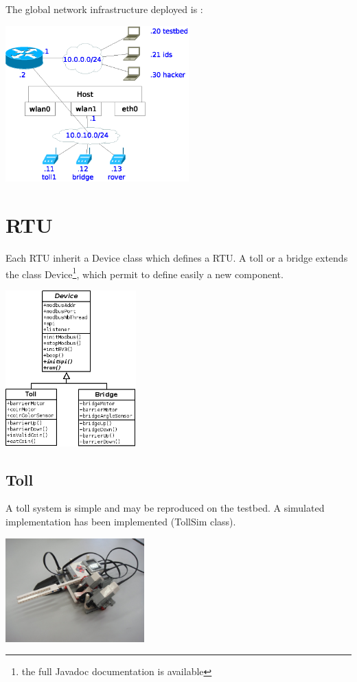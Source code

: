 \documentclass[10pt,a4paper]{article}
\begin{document}
	The global network infrastructure deployed is :
	
	\begin{center}
	\includegraphics[height=6cm]{rsrc/schema_reseau.eps}
	\end{center}

\section{RTU}
	Each RTU inherit a Device class which defines a RTU. A toll or a bridge extends the class Device\footnote{the full Javadoc documentation is available}, which permit to define easily a new component.
	
	\begin{center}
	\includegraphics[height=6cm]{rsrc/Device_class.png}
	\end{center}
		
	\subsection{Toll}
		
		A toll system is simple and may be reproduced on the testbed. A simulated implementation has been implemented (TollSim class).
		
		\begin{center}
		\includegraphics[height=4cm]{rsrc/Toll_01.jpg}
		\end{center}
		
\end{document}
